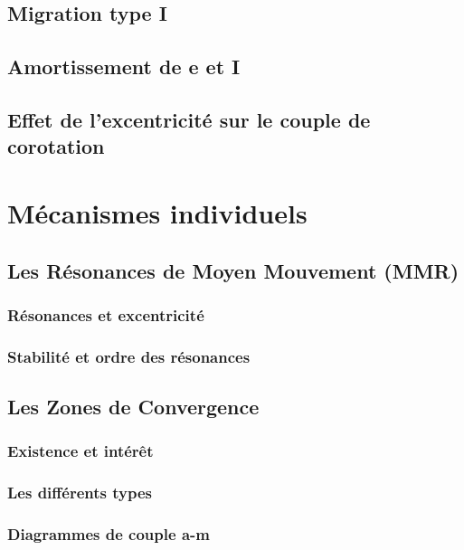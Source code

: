 \documentclass[logos,parttoc]{bordeaux-thesis}
\begin{document}
\section{Migration type I}
\section{Amortissement de e et I}
\section{Effet de l'excentricité sur le couple de corotation}

\chapter{Mécanismes individuels}
\section{Les Résonances de Moyen Mouvement (MMR)}
\subsection{Résonances et excentricité}
\subsection{Stabilité et ordre des résonances}

\section{Les Zones de Convergence}
\subsection{Existence et intérêt}
\subsection{Les différents types}
\subsection{Diagrammes de couple a-m}
\end{document}

